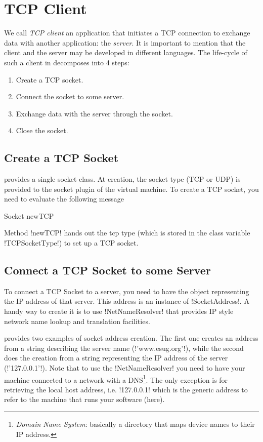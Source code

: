 \documentclass[a4paper,10pt,twoside]{book}
\begin{document}
\section{TCP Client}
\label{sec:clientTcpSocket}
We call \textit{TCP client}  an application that initiates a TCP connection to exchange data with another application: the \textit{server}.
It is important to mention that the client and the server may be developed in different languages.
The life-cycle of such a client in \pharo decomposes into 4 steps:
\begin{enumerate}
\item Create a TCP socket.
\item Connect the socket to some server.
\item Exchange data with the server through the socket.
\item Close the socket.
\end{enumerate}

\subsection{Create a TCP Socket}
\pharo provides a single socket class.
At creation, the socket type (TCP or UDP) is provided to the socket plugin of the virtual machine.
To create a TCP socket, you need to evaluate the following message 
\begin{code}{}
Socket newTCP
\end{code}
Method \ct!newTCP! hands out the tcp type (which is stored in the class variable \ct!TCPSocketType!) to set up a TCP socket.

\subsection{Connect a TCP Socket to some Server}
To connect a TCP Socket to a server, you need to have the object representing the IP address of that server. This address is an instance of \ct!SocketAddress!.
A handy way to create it is to use \ct!NetNameResolver! that  provides IP style network name lookup and translation facilities.

 provides two examples of socket address creation.
The first one creates an address from a string describing the server name (\ct!'www.esug.org'!), while the second does the creation from a string representing the  IP address of the server (\ct!'127.0.0.1'!).
Note that to use the \ct!NetNameResolver! you need to have your machine connected to a network with a DNS\footnote{\emph{Domain Name System}: basically a directory that maps device names to their IP address.}.
The only exception is for retrieving the local host address, i.e. \ct!127.0.0.1! which is the generic address to refer to the machine that runs your software (\pharo here).
\end{document}
